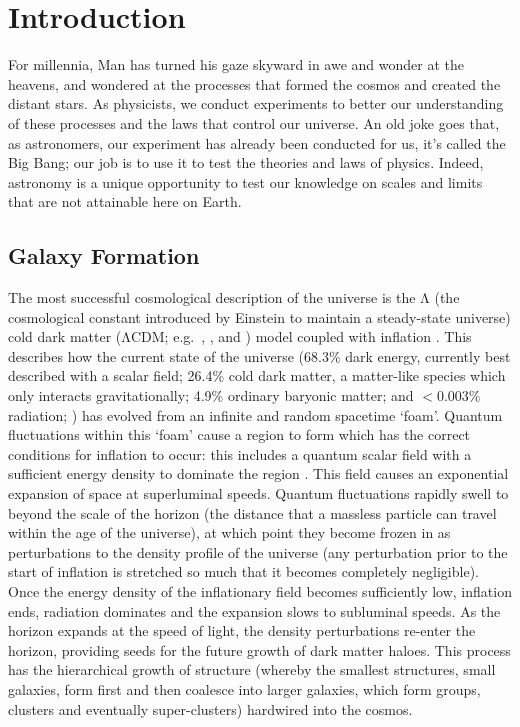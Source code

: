 \chapter{Introduction}
	\label{cha:intro}
For millennia, Man has turned his gaze skyward in awe and wonder at the heavens, and wondered at the processes that formed the cosmos and created the distant stars. As physicists, we conduct experiments to better our understanding of these processes and the laws that control our universe. An old joke goes that, as astronomers, our experiment has already been conducted for us, it's called the Big Bang; our job is to use it to test the theories and laws of physics. Indeed, astronomy is a unique opportunity to test our knowledge on scales and limits that are not attainable here on Earth.

\section{Galaxy Formation}
	The most successful cosmological description of the universe is the $\mathrm{\Lambda}$ (the cosmological constant introduced by Einstein to maintain a steady-state universe) cold dark matter ({$\mathrm{\Lambda}$}CDM; e.g.\ \citealt{Peebles1982}, \citealt{Bond1982}, \citealt{Blumenthal1982} and \citealt{Blumenthal1984}) model coupled with inflation \citep[e.g.][]{Guth1981}. This describes how the current state of the universe (68.3\% dark energy, currently best described with a scalar field; 26.4\% cold dark matter, a matter-like species which only interacts gravitationally; 4.9\% ordinary baryonic matter; and $<$0.003\% radiation; \citealt{PlanckCollaboration2016}) has evolved from an infinite and random spacetime `foam'. Quantum fluctuations within this `foam' cause a region to form which has the correct conditions for inflation to occur: this includes a quantum scalar field with a sufficient energy density to dominate the region \citep{Linde1982, Albrecht1982}. This field causes an exponential expansion of space at superluminal speeds. Quantum fluctuations rapidly swell to beyond the scale of the horizon (the distance that a massless particle can travel within the age of the universe), at which point they become frozen in as perturbations to the density profile of the universe (any perturbation prior to the start of inflation is stretched so much that it becomes completely negligible). Once the energy density of the inflationary field becomes sufficiently low, inflation ends, radiation dominates and the expansion slows to subluminal speeds. As the horizon expands at the speed of light, the density perturbations re-enter the horizon, providing seeds for the future growth of dark matter haloes. This process has the hierarchical growth of structure (whereby the smallest structures, small galaxies, form first and then coalesce into larger galaxies, which form groups, clusters and eventually super-clusters) hardwired into the cosmos. 

